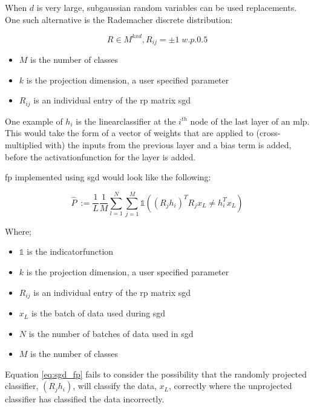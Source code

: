 When $d$ is very large, subgaussian random variables can be used replacements. One such alternative is the Rademacher discrete distribution:

\begin{equation}
R \in M^{kxd}, R_{ij} = \pm 1 \; w.p. 0.5 
\end{equation}

\begin{itemize}
\itemsep-1em 
\item $M$ is the number of classes  
\item $k$ is the projection dimension, a user specified parameter 
\item $R_{ij}$ is an individual entry of the \gls{rp} matrix  \gls{sgd}  
\end{itemize}

One example of $h_i$ is the \gls{linearclassifier} at the $i^{th}$ node of the last layer of an \gls{mlp}. This would take the form of a vector of weights that are applied to (cross-multiplied with) the inputs from the previous layer and a bias term is added, before the \gls{activationfunction} for the layer is added.
\bigskip

\bigskip

\gls{fp} implemented using  \gls{sgd} would look like the following:

\begin{equation}
\hat{P}\ := \frac{1}{L}\frac{1}{M}\sum_{l = 1}^N \sum_{j = 1}^M \mathds{1}((R_j h_i)^T R_jx_L \neq h_i^Tx_L)  
\label{eq:sgd_fp}
\end{equation}

Where;  \smallskip

\begin{itemize}
\itemsep-1em 
\item $\mathds{1}$ is the \gls{indicatorfunction}  
\item $k$ is the projection dimension, a user specified parameter 
\item $R_{ij}$ is an individual entry of the \gls{rp} matrix  \gls{sgd} 
\item $x_L$ is the batch of data used during  \gls{sgd}  
\item $N$ is the number of batches of data used in  \gls{sgd}  
\item $M$ is the number of classes %
\end{itemize}

Equation \ref{eq:sgd_fp} fails to consider the possibility that the randomly projected classifier,  $(R_j h_i)$, will classify the data, $x_L$, correctly where the unprojected classifier has classified the data incorrectly.
\bigskip

